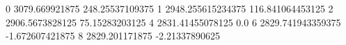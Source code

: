 0 3079.669921875 248.25537109375
1 2948.255615234375 116.841064453125
2 2906.5673828125 75.15283203125
4 2831.41455078125 0.0
6 2829.741943359375 -1.672607421875
8 2829.201171875 -2.21337890625
